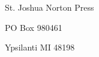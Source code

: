 \documentclass[12pt]{article}
\begin{document}
\newpage

\thispagestyle{empty}
\vspace*{12cm}
\begin{sideways}
\Large{St. Joshua Norton Press}
\end{sideways}
\begin{sideways}
\Large{PO Box 980461}
\end{sideways}
\begin{sideways}
\Large{Ypsilanti MI 48198}
\end{sideways}
\end{document}
